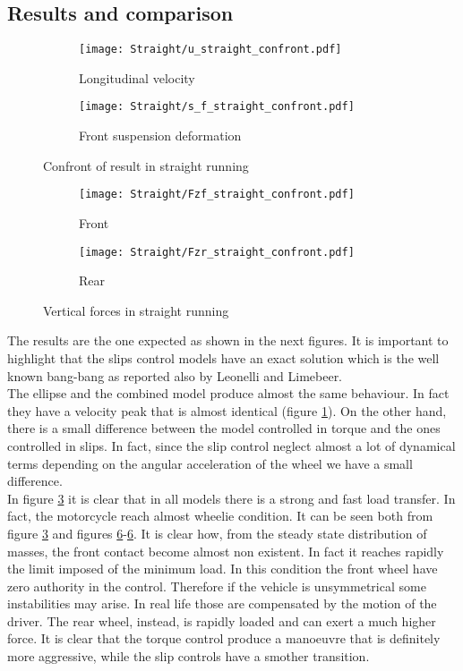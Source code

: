\subsection{Results and comparison}
%
\begin{figure}[t]
    \begin{subfigure}{0.5\linewidth}
        \texttt{[image: Straight/u\_straight\_confront.pdf]}
        \caption{Longitudinal velocity}
        \label{fig:Straight1a}
    \end{subfigure}%
    \begin{subfigure}{0.5\linewidth}
        \texttt{[image: Straight/s\_f\_straight\_confront.pdf]}
        \caption{Front suspension deformation}
        \label{fig:Straight1b}
    \end{subfigure}
    \caption{Confront of result in straight running}
\end{figure}
%
%
\begin{figure}[t]
    \begin{subfigure}{0.5\linewidth}
        \texttt{[image: Straight/Fzf\_straight\_confront.pdf]}
        \caption{Front}
        \label{fig:Straight2a}
    \end{subfigure}%
    \begin{subfigure}{0.5\linewidth}
        \texttt{[image: Straight/Fzr\_straight\_confront.pdf]}
        \caption{Rear}
        \label{fig:Straight2b}
    \end{subfigure}
    \caption{Vertical forces in straight running}
\end{figure}
%
%
The results are the one expected as shown in the next figures. It is important to highlight that the slips control models have an exact solution which is the well known bang-bang as reported also by Leonelli and Limebeer. \cite{leonelli2019optimal}\\ 
The ellipse and the combined model produce almost the same behaviour. In fact they have a velocity peak that is almost identical (figure \ref{fig:Straight1a}). On the other hand, there is a small difference between the model controlled in torque and the ones controlled in slips. In fact, since the slip control neglect almost a lot of dynamical terms depending on the angular acceleration of the wheel we have a small difference.\\
In figure \ref{fig:Straight1b} it is clear that in all models there is a strong and fast load transfer. In fact, the motorcycle reach almost wheelie condition. It can be seen both from figure \ref{fig:Straight1b} and figures \ref{fig:Straight2b}-\ref{fig:Straight2b}. It is clear how, from the steady state distribution of masses, the front contact become almost non existent. In fact it reaches rapidly the limit imposed of the minimum load. In this condition the front wheel have zero authority in the control. Therefore if the vehicle is unsymmetrical some instabilities may arise. In real life those are compensated by the motion of the driver. The rear wheel, instead, is rapidly loaded and can exert a much higher force. It is clear that the torque control produce a manoeuvre that is definitely more aggressive, while the slip controls have a smother transition.
